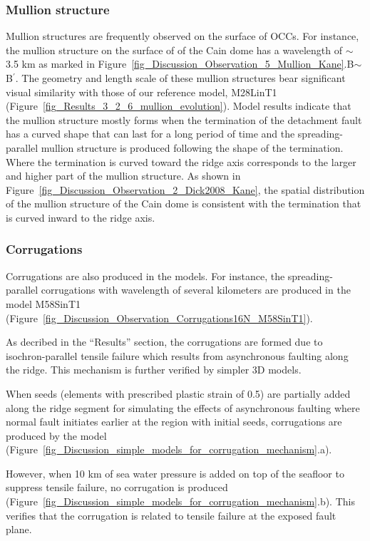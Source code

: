 \documentclass[draft,gc]{agutex}
\begin{document}
\begin{article}
\subsubsection{Mullion structure}
Mullion structures are frequently observed on the surface of OCCs. For instance, the mullion structure on the surface of of the Cain dome has a wavelength of $\sim$3.5 km as marked in Figure~\ref{fig_Discussion_Observation_5_Mullion_Kane}.B$\sim$B$^\prime$. The geometry and length scale of these mullion structures bear significant visual similarity with those of our reference model, M28LinT1 (Figure~\ref{fig_Results_3_2_6_mullion_evolution}). Model results indicate that the mullion structure mostly forms when the termination of the detachment fault has a curved shape that can last for a long period of time and the spreading-parallel mullion structure is produced following the shape of the termination. Where the termination is curved toward the ridge axis corresponds to the larger and higher part of the mullion structure. As shown in Figure~\ref{fig_Discussion_Observation_2_Dick2008_Kane}, the spatial distribution of the mullion structure of the Cain dome is consistent with the termination that is curved inward to the ridge axis.

\subsubsection{Corrugations}
Corrugations are also produced in the models. For instance, the spreading-parallel corrugations with wavelength of several kilometers are produced in the model M58SinT1 (Figure~\ref{fig_Discussion_Observation_Corrugations16N_M58SinT1}).

As decribed in the ``Results'' section, the corrugations are formed due to isochron-parallel tensile failure which results from asynchronous faulting along the ridge. This mechanism is further verified by simpler 3D models.

When seeds (elements with prescribed plastic strain of 0.5) are partially added along the ridge segment for simulating the effects of asynchronous faulting where normal fault initiates earlier at the region with initial seeds, corrugations are produced by the model (Figure~\ref{fig_Discussion_simple_models_for_corrugation_mechanism}.a).

However, when 10 km of sea water pressure is added on top of the seafloor to suppress tensile failure, no corrugation is produced (Figure~\ref{fig_Discussion_simple_models_for_corrugation_mechanism}.b). This verifies that the corrugation is related to tensile failure at the exposed fault plane.


\end{article}
\end{document}
